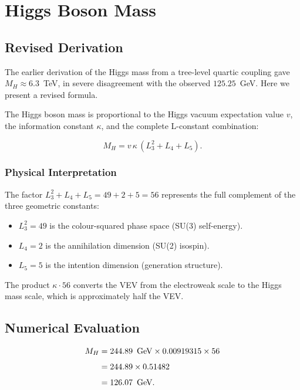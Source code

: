 \chapter{Higgs Boson Mass}
\label{ch:higgs_mass}

\section{Revised Derivation}

The earlier derivation of the Higgs mass from a tree-level quartic
coupling gave $M_H \approx 6.3$~TeV, in severe disagreement with the
observed $125.25$~GeV.  Here we present a revised formula.

The Higgs boson mass is proportional to the Higgs vacuum expectation
value $v$, the information constant $\kappa$, and the complete
L-constant combination:

\begin{equation}
M_H = v\,\kappa\,(L_3^2 + L_4 + L_5).
\label{eq:higgs_mass}
\end{equation}

\subsection{Physical Interpretation}

The factor $L_3^2 + L_4 + L_5 = 49 + 2 + 5 = 56$ represents the full
complement of the three geometric constants:
\begin{itemize}
\item $L_3^2 = 49$ is the colour-squared phase space (SU(3) self-energy).
\item $L_4 = 2$ is the annihilation dimension (SU(2) isospin).
\item $L_5 = 5$ is the intention dimension (generation structure).
\end{itemize}

The product $\kappa \cdot 56$ converts the VEV from the electroweak scale
to the Higgs mass scale, which is approximately half the VEV.

\section{Numerical Evaluation}

\[
\begin{aligned}
M_H &= 244.89\ \,\text{GeV} \times 0.00919315 \times 56 \\[4pt]
    &= 244.89 \times 0.51482 \\[4pt]
    &= 126.07\ \,\text{GeV}.
\end{aligned}
\]

